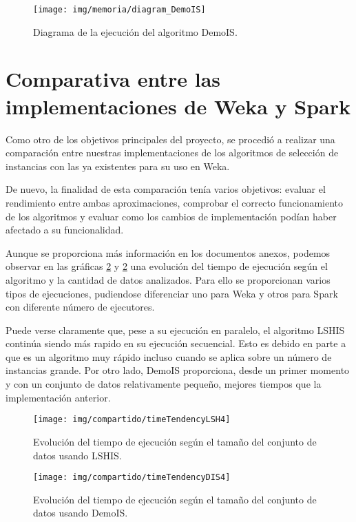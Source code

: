 	\begin{figure}[!h]
		\centering
		\texttt{[image: img/memoria/diagram\_DemoIS]}
		\caption{Diagrama de la ejecución del algoritmo DemoIS.}\label{fig:img/memoria/diagram_DemoIS}
	\end{figure}
	\FloatBarrier


\section{Comparativa entre las implementaciones de Weka y Spark}

Como otro de los objetivos principales del proyecto, se procedió a realizar una comparación entre nuestras implementaciones de los algoritmos de selección de instancias con las ya existentes para su uso en Weka.

De nuevo, la finalidad de esta comparación tenía varios objetivos: evaluar el rendimiento entre ambas aproximaciones, comprobar el correcto funcionamiento de los algoritmos y evaluar como los cambios de implementación podían haber afectado a su funcionalidad.

Aunque se proporciona más información en los documentos anexos, podemos observar en las gráficas \ref{fig:img/compartido/timeTendencyLSH4} y \ref{fig:img/compartido/timeTendencyLSH4} una evolución del tiempo de ejecución según el algoritmo y la cantidad de datos analizados. Para ello se proporcionan varios tipos de ejecuciones, pudiendose diferenciar uno para Weka y otros para Spark con diferente número de ejecutores.

Puede verse claramente que, pese a su ejecución en paralelo, el algoritmo LSHIS continúa siendo más rapido en su ejecución secuencial. Esto es debido en parte a que es un algoritmo muy rápido incluso cuando se aplica sobre un número de instancias grande. Por otro lado, DemoIS proporciona, desde un primer momento y con un conjunto de datos relativamente pequeño, mejores tiempos que la implementación anterior.

	\begin{figure}[!h]
		\centering
		\texttt{[image: img/compartido/timeTendencyLSH4]}
		\caption{Evolución del tiempo de ejecución según el tamaño del conjunto de datos usando LSHIS.}\label{fig:img/compartido/timeTendencyLSH4}
	\end{figure}
	
		\begin{figure}[!h]
		\centering
		\texttt{[image: img/compartido/timeTendencyDIS4]}
		\caption{Evolución del tiempo de ejecución según el tamaño del conjunto de datos usando DemoIS.}\label{fig:img/compartido/timeTendencyDIS4}
	\end{figure}
	\FloatBarrier


